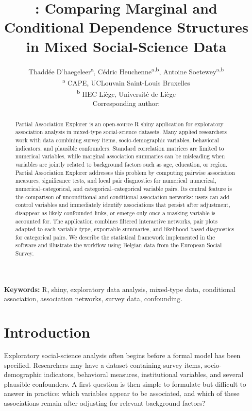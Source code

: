 \documentclass[11pt]{article}
\author{
  Thadd\'ee D'haegeleer\textsuperscript{a},
  C\'edric Heuchenne\textsuperscript{a,b},
  Antoine Soetewey\textsuperscript{a,b}\\[0.6em]
  \normalsize\textsuperscript{a} CAPE, UCLouvain Saint-Louis Bruxelles\\
  \normalsize\textsuperscript{b} HEC Li\`ege, Universit\'e de Li\`ege\\[0.4em]
  \normalsize Corresponding author: \email{thaddee.dhaegeleer@uclouvain.be}
}
\title{\appname: Comparing Marginal and Conditional Dependence Structures in Mixed Social-Science Data}
\date{}
\newcommand{\appname}{Partial Association Explorer}
\newcommand{\pkg}[1]{\textsf{#1}}
\newcommand{\proglang}[1]{\textsf{#1}}
\begin{document}
\maketitle

\begin{abstract}
  \appname{} is an open-source \proglang{R} \citep{R} \pkg{shiny}
  \citep{Shiny} application for exploratory association analysis in mixed-type
  social-science datasets. Many applied researchers work with data combining
  survey items, socio-demographic variables, behavioral indicators, and
  plausible confounders. Standard correlation matrices are limited to
  numerical variables, while marginal association summaries can be misleading
  when variables are jointly related to background factors such as age,
  education, or region. \appname{} addresses this problem by computing
  pairwise association measures, significance tests, and local pair diagnostics
  for numerical--numerical, numerical--categorical, and
  categorical--categorical variable pairs. Its central feature is the
  comparison of unconditional and conditional association networks: users can
  add control variables and immediately identify associations that persist
  after adjustment, disappear as likely confounded links, or emerge only once a
  masking variable is accounted for. The application combines filtered
  interactive networks, pair plots adapted to each variable type, exportable
  summaries, and likelihood-based diagnostics for categorical pairs. We
  describe the statistical framework implemented in the software and illustrate
  the workflow using Belgian data from the European Social Survey.
\end{abstract}

\noindent\textbf{Keywords:} \proglang{R}, \pkg{shiny}, exploratory data analysis, mixed-type data, conditional association, association networks, survey data, confounding.

\bigskip

\section{Introduction}
\label{sec:intro}

Exploratory social-science analysis often begins before a formal model has
been specified. Researchers may have a dataset containing survey items,
socio-demographic indicators, behavioral measures, institutional variables,
and several plausible confounders. A first question is then simple to formulate
but difficult to answer in practice: which variables appear to be associated,
and which of these associations remain after adjusting for relevant background
factors?
\end{document}
